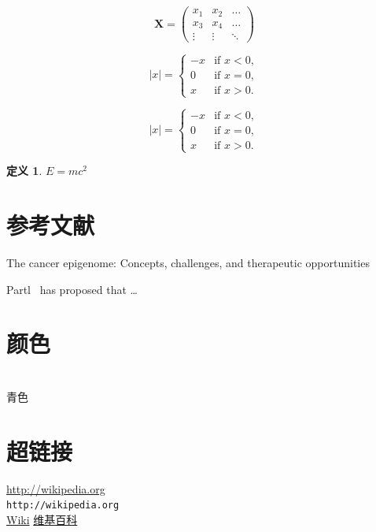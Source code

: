 \documentclass[utf8]{book}
\newtheorem{mathdefintion}{定义}[section]
\begin{document}
		\begin{equation}
			\mathbf{X} = \left(
			\begin{array}{ccc}
			x_1 & x_2 & \ldots \\
			x_3 & x_4 & \ldots \\
			\vdots & \vdots & \ddots
			\end{array} \right)
		\end{equation}
		
		\begin{equation}
			|x| = \left\{
			\begin{array}{rl}
			-x & \text{if } x < 0,\\
			0 & \text{if } x = 0,\\
			x & \text{if } x > 0.
			\end{array} \right.
		\end{equation}
		
		\begin{equation}
			|x| =
			\begin{cases}
			-x & \text{if } x < 0,\\
			0 & \text{if } x = 0,\\
			x & \text{if } x > 0.
			\end{cases}
		\end{equation}
		
		\begin{mathdefintion}
			$ E = mc^2 $
		\end{mathdefintion}
		
		\section{参考文献}
		
		
		 The cancer epigenome: Concepts, challenges, and therapeutic opportunities \cite{Dawson1147}
		
		
		Partl~\cite{pa} has proposed that \ldots
		
		
	
	\section{颜色}
		\large{} \\
		{\color[rgb]{0,1,1} 青色}
		\label{great_color}
		
	\section{超链接}
		\url{http://wikipedia.org} \\
		\nolinkurl{http://wikipedia.org} \\
		\href{http://wikipedia.org}{Wiki}
		\hyperref[great_color]{维基百科}
	
\end{document}
